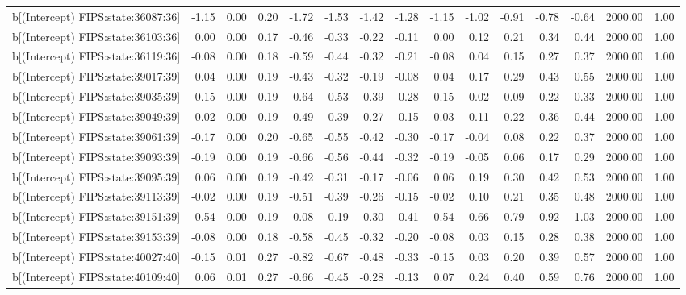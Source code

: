 \begin{table}[ht]
\begin{tabular}{rrrrrrrrrrrrrrr}
  b[(Intercept) FIPS:state:36087:36] & -1.15 & 0.00 & 0.20 & -1.72 & -1.53 & -1.42 & -1.28 & -1.15 & -1.02 & -0.91 & -0.78 & -0.64 & 2000.00 & 1.00 \\ 
  b[(Intercept) FIPS:state:36103:36] & 0.00 & 0.00 & 0.17 & -0.46 & -0.33 & -0.22 & -0.11 & 0.00 & 0.12 & 0.21 & 0.34 & 0.44 & 2000.00 & 1.00 \\ 
  b[(Intercept) FIPS:state:36119:36] & -0.08 & 0.00 & 0.18 & -0.59 & -0.44 & -0.32 & -0.21 & -0.08 & 0.04 & 0.15 & 0.27 & 0.37 & 2000.00 & 1.00 \\ 
  b[(Intercept) FIPS:state:39017:39] & 0.04 & 0.00 & 0.19 & -0.43 & -0.32 & -0.19 & -0.08 & 0.04 & 0.17 & 0.29 & 0.43 & 0.55 & 2000.00 & 1.00 \\ 
  b[(Intercept) FIPS:state:39035:39] & -0.15 & 0.00 & 0.19 & -0.64 & -0.53 & -0.39 & -0.28 & -0.15 & -0.02 & 0.09 & 0.22 & 0.33 & 2000.00 & 1.00 \\ 
  b[(Intercept) FIPS:state:39049:39] & -0.02 & 0.00 & 0.19 & -0.49 & -0.39 & -0.27 & -0.15 & -0.03 & 0.11 & 0.22 & 0.36 & 0.44 & 2000.00 & 1.00 \\ 
  b[(Intercept) FIPS:state:39061:39] & -0.17 & 0.00 & 0.20 & -0.65 & -0.55 & -0.42 & -0.30 & -0.17 & -0.04 & 0.08 & 0.22 & 0.37 & 2000.00 & 1.00 \\ 
  b[(Intercept) FIPS:state:39093:39] & -0.19 & 0.00 & 0.19 & -0.66 & -0.56 & -0.44 & -0.32 & -0.19 & -0.05 & 0.06 & 0.17 & 0.29 & 2000.00 & 1.00 \\ 
  b[(Intercept) FIPS:state:39095:39] & 0.06 & 0.00 & 0.19 & -0.42 & -0.31 & -0.17 & -0.06 & 0.06 & 0.19 & 0.30 & 0.42 & 0.53 & 2000.00 & 1.00 \\ 
  b[(Intercept) FIPS:state:39113:39] & -0.02 & 0.00 & 0.19 & -0.51 & -0.39 & -0.26 & -0.15 & -0.02 & 0.10 & 0.21 & 0.35 & 0.48 & 2000.00 & 1.00 \\ 
  b[(Intercept) FIPS:state:39151:39] & 0.54 & 0.00 & 0.19 & 0.08 & 0.19 & 0.30 & 0.41 & 0.54 & 0.66 & 0.79 & 0.92 & 1.03 & 2000.00 & 1.00 \\ 
  b[(Intercept) FIPS:state:39153:39] & -0.08 & 0.00 & 0.18 & -0.58 & -0.45 & -0.32 & -0.20 & -0.08 & 0.03 & 0.15 & 0.28 & 0.38 & 2000.00 & 1.00 \\ 
  b[(Intercept) FIPS:state:40027:40] & -0.15 & 0.01 & 0.27 & -0.82 & -0.67 & -0.48 & -0.33 & -0.15 & 0.03 & 0.20 & 0.39 & 0.57 & 2000.00 & 1.00 \\ 
  b[(Intercept) FIPS:state:40109:40] & 0.06 & 0.01 & 0.27 & -0.66 & -0.45 & -0.28 & -0.13 & 0.07 & 0.24 & 0.40 & 0.59 & 0.76 & 2000.00 & 1.00 \\ 

\end{tabular}
\end{table}
